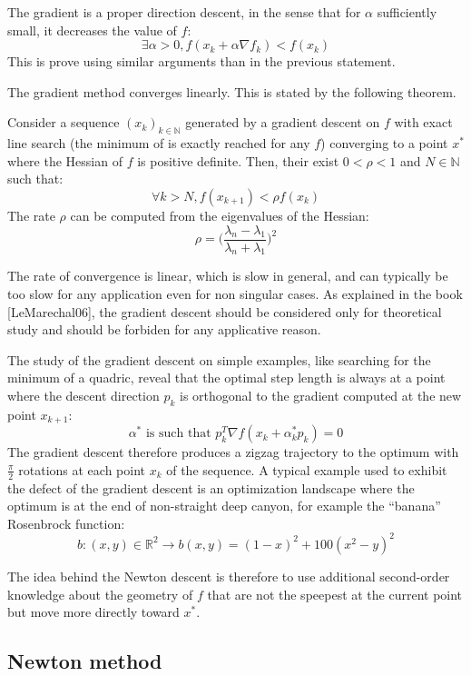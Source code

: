 \documentclass{book}
\begin{document}
The gradient is a proper direction descent, in the sense that for $\alpha$ sufficiently small, it decreases the value of $f$:
\[ \exists \alpha>0, f(x_k+\alpha \nabla f_k) < f(x_k) \]
This is prove using similar arguments than in the previous statement.

The gradient method converges linearly. This is stated by the following theorem.
\begin{theorem}
Consider a sequence $(x_k)_{k\in\mathbb{N}}$ generated by a gradient descent on $f$ with exact line search (\mie the minimum of  is exactly reached for any $f$) converging to a point $x^*$ where the Hessian of $f$ is positive definite. Then, their exist $0<\rho<1$ and $N\in\mathbb{N}$ such that:\[ \forall k>N, f(x_{k+1}) < \rho f(x_k) \]
The rate $\rho$ can be computed from the eigenvalues of the Hessian:
\[ \rho = \Big( \frac{\lambda_n - \lambda_1}{\lambda_n + \lambda_1} \Big)^2 \]
\end{theorem}

The rate of convergence is linear, which is slow in general, and can typically be too slow for any application even for non singular cases. As explained in the book [LeMarechal06], the gradient descent should be considered only for theoretical study and should be forbiden for any applicative reason.

The study of the gradient descent on simple examples, like searching for the minimum of a quadric, reveal that the optimal step length is always at a point where the descent direction $p_k$ is orthogonal to the gradient computed at the new point $x_{k+1}$:
\[ \alpha^* \textrm{ is such that } p_k^T \nabla f(x_k + \alpha_k^* p_k) = 0 \]
The gradient descent therefore produces a zigzag trajectory to the optimum with $\frac{\pi}{2}$ rotations at each point $x_k$ of the sequence. A typical example used to exhibit the defect of the gradient descent is an optimization landscape where the optimum is at the end of non-straight deep canyon, for example the ``banana'' Rosenbrock function:
\[ b: (x,y) \in \mathbb{R}^2 \rightarrow b(x,y) =  (1-x)^2  + 100 (x^2 - y)^2 \]

The idea behind the Newton descent is therefore to use additional second-order knowledge about the geometry of $f$ that are not the speepest at the current point but move more directly toward $x^*$.

\subsection{Newton method}
\end{document}
